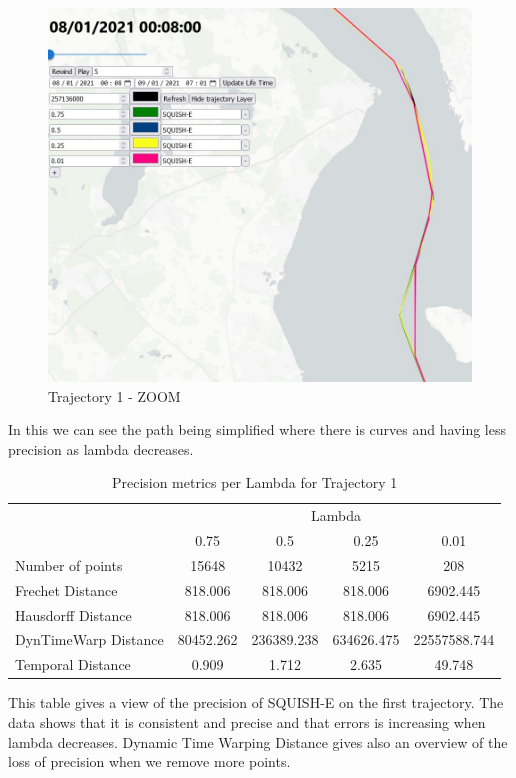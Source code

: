 \begin{figure}[!h]
    \centering
    \includegraphics[width=0.5\linewidth]{figures/Stats/squish_1_zoom.jpg}
    \caption{Trajectory 1 - ZOOM }
    \label{fig:traj_1_sqzoom}
\end{figure}

In this we can see the path being simplified where there is curves and having less precision as lambda decreases.

\begin{table}[htbp]
    \centering
    \label{tab:precision_metrics}
    \begin{tabular}{@{}lcccc@{}}
        \toprule
        & \multicolumn{4}{c}{Lambda} \\
        \cmidrule{2-5}
        & 0.75       & 0.5        & 0.25       & 0.01       \\
        \midrule
        Number of points           & 15648 & 10432 & 5215 & 208 \\
        Frechet Distance              & 818.006 & 818.006 & 818.006 & 6902.445 \\
        Hausdorff Distance             & 818.006 & 818.006 & 818.006 & 6902.445 \\
        DynTimeWarp Distance            & 80452.262 &  236389.238 & 634626.475 & 22557588.744\\
        Temporal Distance            & 0.909 & 1.712 & 2.635 & 49.748\\
        \bottomrule
    \end{tabular}
    \caption{Precision metrics per Lambda for Trajectory 1 }
\end{table}

This table gives a view of the precision of SQUISH-E on the first trajectory. The data shows that it is consistent and precise and that errors is increasing when lambda decreases. Dynamic Time Warping Distance gives also an overview of the loss of precision when we remove more points.

